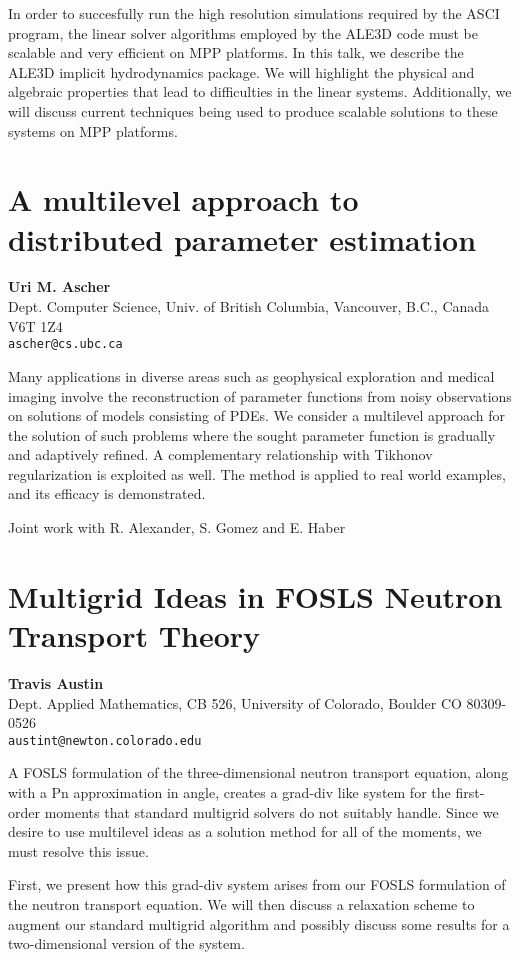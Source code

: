 \documentclass[11pt]{article}
\newcommand{\nextab}[4]{
	\section{#2}
	{\bf #1} \\ \nopagebreak
	{#3} \\ \nopagebreak
	{\tt #4} \nopagebreak
	}
\begin{document}
In order to succesfully
run the high resolution simulations required by the ASCI program,
the linear solver algorithms employed by the ALE3D code must be scalable
and very efficient on MPP platforms.
In this talk, we describe
the ALE3D implicit hydrodynamics package. We will highlight the
physical and algebraic properties that lead to difficulties in the linear
systems. Additionally, we will discuss current techniques being used to
produce scalable solutions to these systems on MPP platforms.





\nextab{Uri M. Ascher}
	{A multilevel approach to distributed parameter estimation}
	{Dept. Computer Science,
	Univ. of British Columbia,
	Vancouver, B.C., Canada V6T 1Z4}
	{ascher@cs.ubc.ca}

Many applications in diverse areas such as geophysical
exploration and medical imaging involve the reconstruction
of parameter functions from noisy observations on
solutions of models consisting of PDEs.
We consider a multilevel approach for the solution of
such problems where the sought parameter function
is gradually and adaptively refined.
A complementary relationship with Tikhonov regularization
is exploited as well.
The method is applied to real world examples, and
its efficacy is demonstrated.

Joint work with R. Alexander, S. Gomez and E. Haber




\nextab{Travis Austin}
	{Multigrid Ideas in FOSLS Neutron Transport Theory}
	{Dept. Applied Mathematics,
	CB 526,
	University of Colorado,
	Boulder CO 80309-0526}
	{austint@newton.colorado.edu}

A FOSLS formulation of the three-dimensional neutron transport equation,
along with a Pn approximation in angle, creates a grad-div like system
for the first-order moments that standard multigrid solvers do not suitably
handle.  Since we desire to use multilevel ideas as a solution method for
all of the moments, we must resolve this issue.

First, we present how this grad-div system arises from our FOSLS
formulation of the neutron transport equation.  We will then discuss a
relaxation scheme to augment our standard multigrid algorithm and
possibly discuss some results for a two-dimensional version of the system.
\end{document}
